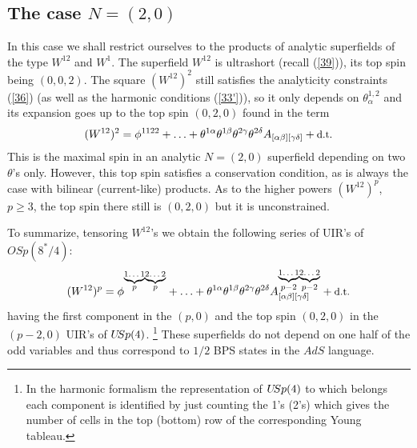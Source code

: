 \documentclass[a4paper,12pt]{article}
\begin{document}
\subsection{The case $N=(2,0)$}


In this case we shall restrict ourselves to the products of 
analytic superfields of the type $W^{12}$ and $W^1$. The 
superfield $W^{12}$ is ultrashort (recall (\ref{39})), its top 
spin being $(0,0,2)$. The square $(W^{12})^2$ still satisfies the 
analyticity constraints (\ref{36}) (as well as the harmonic 
conditions (\ref{33'})), so it only depends on 
$\theta^{1,2}_\alpha$ and its expansion goes up to the top spin 
$(0,2,0)$ found in the term 
\begin{equation}\label{56}
 (W^{12})^2 = \phi^{1122} + \ldots 
+ \theta^{1\alpha}\theta^{1\beta}\theta^{2\gamma}\theta^{2\delta} 
A_{[\alpha\beta][\gamma\delta]} + \mbox{\small d.t.} 
\end{equation}
This is the maximal spin in an analytic $N=(2,0)$ superfield 
depending on two $\theta$'s only. However, this top spin satisfies 
a conservation condition, as is always the case with bilinear 
(current-like) products. As to the higher powers $(W^{12})^p$, 
$p\geq 3$, the top spin there still is $(0,2,0)$ but it is 
unconstrained. 

To summarize, tensoring $W^{12}$'s we obtain the following series 
of UIR's of $OSp(8^*/4)$:
\begin{equation}\label{series1}
  (W^{12})^p = \phi^{\stackrel{\underbrace{\mbox{\scriptsize 1\ldots 1}}}{p}
\stackrel{\underbrace{\mbox{\scriptsize 2\ldots 2}}}{p}} + \ldots 
+  \theta^{1\alpha}\theta^{1\beta}\theta^{2\gamma}\theta^{2\delta} 
A^{\stackrel{\underbrace{\mbox{\scriptsize 1\ldots 1}}}{p-2} 
\stackrel{\underbrace{\mbox{\scriptsize 2\ldots 
2}}}{p-2}}_{[\alpha\beta][\gamma\delta]} + \mbox{\small d.t.} 
\end{equation}
having the first component in the $(p,0)$ and the top spin 
$(0,2,0)$ in the $(p-2,0)$ UIR's of $U\hskip-2pt Sp(4)$.  
\footnote{In the harmonic formalism the representation of 
$U\hskip-2pt Sp(4)$ to which belongs each component is identified 
by just counting the 1's (2's) which gives the number of cells in 
the top (bottom) row of the corresponding Young tableau.} These 
superfields do not depend on one half of the odd variables and 
thus correspond to $1/2$ BPS states in the $AdS$ language. 
\end{document}
